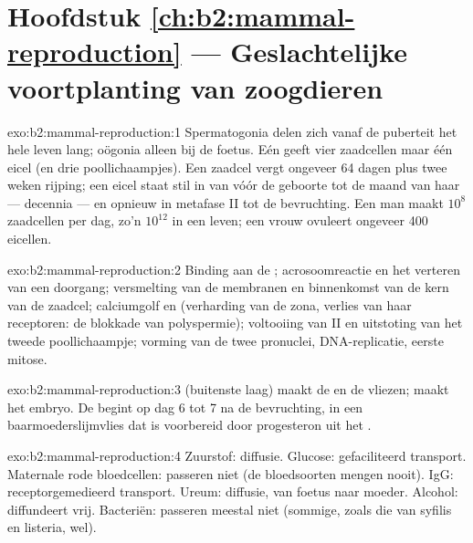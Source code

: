 \section*{Hoofdstuk \ref{ch:b2:mammal-reproduction} --- Geslachtelijke voortplanting van zoogdieren}

\begin{solution}{exo:b2:mammal-reproduction:1}
Spermatogonia delen zich vanaf de puberteit het hele leven lang; oögonia
alleen bij de foetus. Eén  geeft vier zaadcellen maar één eicel (en
drie poollichaampjes). Een zaadcel vergt ongeveer 64 dagen plus twee weken
rijping; een eicel staat stil in  van vóór de geboorte tot de
maand van haar  --- decennia --- en opnieuw in metafase II tot de
bevruchting. Een man maakt $10^{8}$ zaadcellen per dag, zo'n $10^{12}$ in
een leven; een vrouw ovuleert ongeveer 400 eicellen.
\end{solution}

\begin{solution}{exo:b2:mammal-reproduction:2}
Binding aan de ; acrosoomreactie en het verteren van een
doorgang; versmelting van de membranen en binnenkomst van de kern van de
zaadcel; calciumgolf en  (verharding van de zona, verlies
van haar receptoren: de blokkade van polyspermie); voltooiing van  II
en uitstoting van het tweede poollichaampje; vorming van de twee pronuclei,
DNA-replicatie, eerste mitose.
\end{solution}

\begin{solution}{exo:b2:mammal-reproduction:3}
 (buitenste laag) maakt de  en de vliezen;  maakt het embryo. De  begint op dag 6 tot 7 na de
bevruchting, in een baarmoederslijmvlies dat is voorbereid door
progesteron uit het .
\end{solution}

\begin{solution}{exo:b2:mammal-reproduction:4}
Zuurstof: diffusie. Glucose: gefaciliteerd transport. Maternale rode
bloedcellen: passeren niet (de bloedsoorten mengen nooit). IgG:
receptorgemedieerd transport. Ureum: diffusie, van foetus naar moeder.
Alcohol: diffundeert vrij. Bacteriën: passeren meestal niet (sommige, zoals
die van syfilis en listeria, wel).
\end{solution}

